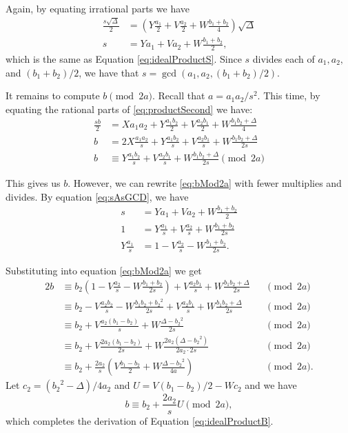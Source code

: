 \documentclass{ucalgthes1}
\theoremstyle{definition}
\begin{document}
\noindent
Again, by equating irrational parts we have
\begin{align}
	\frac{s\sqrt\Delta}{2} & = \left(Y\frac{a_1}{2} + V\frac{a_2}{2} + W\frac{b_1+b_2}{4}\right)\sqrt\Delta \nonumber \\
	s & = Ya_1 + Va_2 + W\frac{b_1+b_2}{2}, \label{eq:sAsGCD}
\end{align}
which is the same as Equation \ref{eq:idealProductS}.  Since $s$ divides each of $a_1, a_2,$ and $(b_1+b_2)/2$, we have that $s = \gcd(a_1, a_2, (b_1+b_2)/2)$.

It remains to compute $b \pmod{2a}$.  Recall that $a = a_1a_2/s^2$.  This time, by equating the rational parts of \eqref{eq:productSecond} we have:
\begin{align}
	\frac{sb}{2} & = Xa_1a_2 + Y\frac{a_1b_2}{2} + V\frac{a_2b_1}{2} + W\frac{b_1b_2 + \Delta}{4} \nonumber \\
	b & = 2X\frac{a_1a_2}{s} + Y\frac{a_1b_2}{s} + V\frac{a_2b_1}{s} + W\frac{b_1b_2 + \Delta}{2s} \nonumber \\
	b & \equiv Y\frac{a_1b_2}{s} + V\frac{a_2b_1}{s} + W\frac{b_1b_2 + \Delta}{2s} \pmod{2a} \label{eq:bMod2a}
\end{align}

\noindent
This gives us $b$.  However, we can rewrite \eqref{eq:bMod2a} with fewer multiplies and divides.  By equation \eqref{eq:sAsGCD}, we have
\begin{align*}
	s & = Ya_1 + Va_2 + W\frac{b_1+b_2}{2} \\
	1 & = Y\frac{a_1}{s} + V\frac{a_2}{s} + W\frac{b_1+b_2}{2s} \\
	Y\frac{a_1}{s} & = 1 - V\frac{a_2}{s} - W\frac{b_1+b_2}{2s}.
\end{align*}

\noindent
Substituting into equation \eqref{eq:bMod2a} we get
\begin{alignat*}{2}
	b & \equiv b_2(1-V\frac{a_2}{s} - W\frac{b_1+b_2}{2s}) + V\frac{a_2b_1}{s} + W\frac{b_1b_2 + \Delta}{2s} && \pmod{2a} \\
	& \equiv b_2 - V\frac{a_2b_2}{s} - W\frac{b_1b_2+{b_2}^2}{2s} + V\frac{a_2b_1}{s} + W\frac{b_1b_2 + \Delta}{2s} && \pmod{2a} \\
	& \equiv b_2 + V\frac{a_2(b_1-b_2)}{s} + W\frac{\Delta - {b_2}^2}{2s} && \pmod{2a} \\
	& \equiv b_2 + V\frac{2a_2(b_1-b_2)}{2s} + W\frac{2a_2(\Delta - {b_2}^2)}{2a_2 \cdot 2s} && \pmod{2a} \\
	& \equiv b_2 + \frac{2a_2}{s} \left( V\frac{b_1-b_2}{2} + W\frac{\Delta - {b_2}^2}{4a} \right) && \pmod{2a}.
\end{alignat*}
Let $c_2 = ({b_2}^2 - \Delta)/4a_2$ and $U = V(b_1-b_2)/2 - Wc_2$ and we have
\[
	b \equiv b_2 + \frac{2a_2}{s} U \pmod{2a},
\]
which completes the derivation of Equation \ref{eq:idealProductB}.
\end{document}
